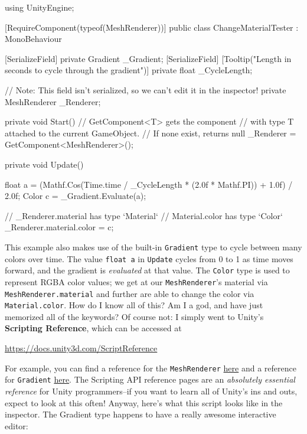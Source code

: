 \documentclass[11pt]{article}
\def\StartLineAt#1{\lstset{firstnumber=#1}}
\begin{document}
\StartLineAt{1}
\begin{csharp}
using UnityEngine;

[RequireComponent(typeof(MeshRenderer))]
public class ChangeMaterialTester : MonoBehaviour
{
    [SerializeField]
    private Gradient _Gradient;
    [SerializeField]
    [Tooltip("Length in seconds to cycle through the gradient")]
    private float _CycleLength;

    // Note: This field isn't serialized, so we can't edit it in the inspector!
    private MeshRenderer _Renderer;

    private void Start()
    {
        // GetComponent<T> gets the component
        // with type T attached to the current GameObject.
        // If none exist, returns null
        _Renderer = GetComponent<MeshRenderer>();
    }

    private void Update()
    {
        float a = (Mathf.Cos(Time.time / _CycleLength * (2.0f * Mathf.PI)) + 1.0f) / 2.0f;
        Color c = _Gradient.Evaluate(a);

        // _Renderer.material has type `Material`
        // Material.color has type `Color`
        _Renderer.material.color = c;
    }
}
\end{csharp}

This example also makes use of the built-in \lstinline|Gradient| type to cycle between many colors
over time.  The value \lstinline|float a| in \lstinline|Update| cycles from 0 to 1 as time moves 
forward, and the gradient is \textit{evaluated} at that value.  The \lstinline|Color| type is used 
to represent RGBA color values; we get at our \lstinline|MeshRenderer|'s material via
\lstinline|MeshRenderer.material| and further are able to change the color via \lstinline|Material.color|.
How do I know all of this?  Am I a god, and have just memorized all of the keywords?  Of course not:
I simply went to Unity's \textbf{Scripting Reference}, which can be accessed at
\begin{center}\href{https://docs.unity3d.com/ScriptReference}{https://docs.unity3d.com/ScriptReference}\end{center}

For example, you can find a reference for the \lstinline|MeshRenderer| 
\href{https://docs.unity3d.com/ScriptReference/MeshRenderer.html}{here} and a reference for
\lstinline|Gradient| \href{https://docs.unity3d.com/ScriptReference/Gradient.html}{here}.  The
Scripting API reference pages are an \textit{absolutely essential reference} for Unity programmers--if
you want to learn all of Unity's ins and outs, expect to look at this often!  Anyway, here's what
this script looks like in the inspector.  The Gradient type happens to have a really awesome interactive editor:
\end{document}
